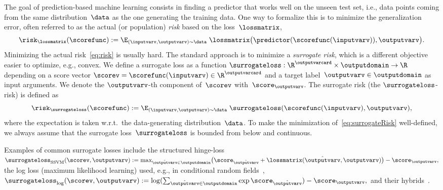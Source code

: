\documentclass{article}
\begin{document}
The goal of prediction-based machine learning consists in finding a predictor that works well on the unseen test set, i.e., data points coming from the same distribution~$\data$ as the one generating the training data.
One way to formalize this is to minimize the generalization error, often referred to as the actual (or population) \emph{risk} based on the loss~$\lossmatrix$,
\begin{equation}
\label{eq:risk}
\risk_\lossmatrix(\scorefunc) := \E_{(\inputvarv, \outputvarv) \sim \data} \;\lossmatrix\bigl( \predictor(\scorefunc(\inputvarv)), \outputvarv \bigr).
\end{equation}
Minimizing the actual risk~\eqref{eq:risk} is usually hard.
The standard approach is to minimize a \emph{surrogate risk}, which is a different objective easier to optimize, e.g., convex.
We define a surrogate loss as a function $\surrogateloss: \R^\outputvarcard \times \outputdomain \to \R$ depending on a score vector $\scorev = \scorefunc(\inputvarv) \in \R^\outputvarcard$ and a target label~$\outputvarv \in \outputdomain$ as input arguments.
We denote the $\outputvarv$-th component of~$\scorev$ with~$\score_\outputvarv$.
The surrogate risk (the $\surrogateloss$-risk) is defined as
\begin{equation}
\label{eq:surrogateRisk}
\risk_\surrogateloss(\scorefunc) := \E_{(\inputvarv, \outputvarv) \sim \data} \;\surrogateloss( \scorefunc(\inputvarv), \outputvarv ),
\end{equation}
where the expectation is taken w.r.t.\ the data-generating distribution~$\data$.
To make the minimization of~\eqref{eq:surrogateRisk} well-defined, we always assume that the surrogate loss~$\surrogateloss$ is bounded from below and continuous.

Examples of common surrogate losses include the structured hinge-loss~\citep{taskar03,tsochantaridis05}
%
%
$
\surrogateloss_{\text{SSVM}}( \scorev, \outputvarv )
:=
\max_{\hat{\outputvarv} \in \outputdomain} \bigl( \score_{\hat{\outputvarv}} + \lossmatrix( \hat{\outputvarv}, \outputvarv ) \bigr) - \score_\outputvarv,
$
%
the log loss (maximum likelihood learning) used, e.g., in conditional random fields~\citep{lafferty01crf},
%
%
$
\surrogateloss_{\text{log}}(\scorev, \outputvarv )
:=
 \log (\sum_{\hat{\outputvarv} \in \outputdomain} \exp \score_{\hat{\outputvarv}} ) - \score_\outputvarv,
$
%
and their hybrids~\citep{pletscher10,gimpel10,hazan10,shi2015hybrid}.

%
%
%
%
\end{document}
